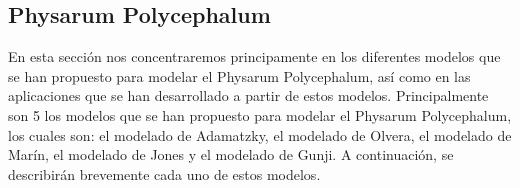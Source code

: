 \subsection{Physarum Polycephalum}
\label{sub:PhysarumArte}
    En esta secci\'on nos concentraremos principamente en los diferentes modelos que se han propuesto para modelar el 
        Physarum Polycephalum, as\'i como en las aplicaciones que se han desarrollado a partir de estos modelos.
        Principalmente son 5 los modelos que se han propuesto para modelar el Physarum Polycephalum, los cuales son:
        el modelado de Adamatzky, el modelado de Olvera, el modelado de Mar\'in, el modelado de Jones y el modelado de
        Gunji. A continuaci\'on, se describir\'an brevemente cada uno de estos modelos.
    
    
    
    
    